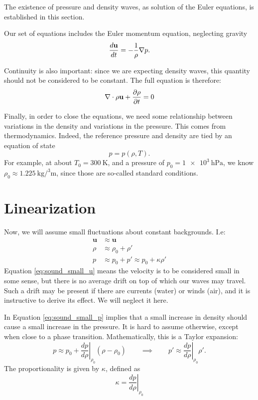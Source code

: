 \label{sec:sound_waves}

The existence of pressure and density waves, as solution of the Euler
equations, is established in this section.

Our set of equations includes the Euler momentum equation, neglecting
gravity
\[
\frac{d \mathbf{u} }{d t}= - \frac{1}{\rho} \nabla p  .
\]

Continuity is also important: since we are expecting density waves,
this quantity should not be considered to be constant. The full
equation is therefore:
\[
\nabla \cdot \rho \mathbf{u} + \frac{\partial \rho}{\partial t} =0
\]

Finally, in order to close the equations, we need some relationship
between variations in the density and variations in the pressure. This
comes from thermodynamics. Indeed, the reference pressure and density
are tied by an equation of state
\[
p=p(\rho,T) .
\]
For example, at about $T_0=\SI{300}{\kelvin}$, and a
pressure of $p_0=\SI{1e3}{\hecto\pascal}$, we know
$\rho_0\approx\SI{1.225}{\kilo\gram\per\cubed\meter}$, since those are
so-called standard conditions.

\section{Linearization}

Now, we will assume small fluctuations about constant backgrounds. I.e:
\begin{align}
  \label{eq:sound_small_u}
  \mathbf{u} & \approx \mathbf{u} \\
  \label{eq:sound_small_rho}
  \rho       & \approx \rho_0 + \rho' \\
  \label{eq:sound_small_p}
  p          & \approx p_0+ p' \approx p_0+ \kappa \rho'
\end{align}
Equation \ref{eq:sound_small_u} means the velocity is to be considered
small in some sense, but there is no average drift on top of which our
waves may travel. Such a drift may be present if there are currents
(water) or winds (air), and it is instructive to derive its effect. We
will neglect it here.

In Equation \ref{eq:sound_small_p} implies that a small increase in
density should cause a small increase in the pressure. It is hard to
assume otherwise, except when close to a phase
transition. Mathematically, this is a Taylor expansion:
\[
p \approx
p_0 +
\left. \frac{d p}{d\rho} \right|_{\rho_0} (\rho-\rho_0)
\qquad\implies\qquad
p' \approx \left. \frac{d p}{d\rho} \right|_{\rho_0} \rho' .
\]
The proportionality is given by $\kappa$, defined as
\begin{equation}
  \label{eq:sound_kappa}
  \kappa =  \left. \frac{d p}{d\rho} \right|_{\rho_0} 
\end{equation}

